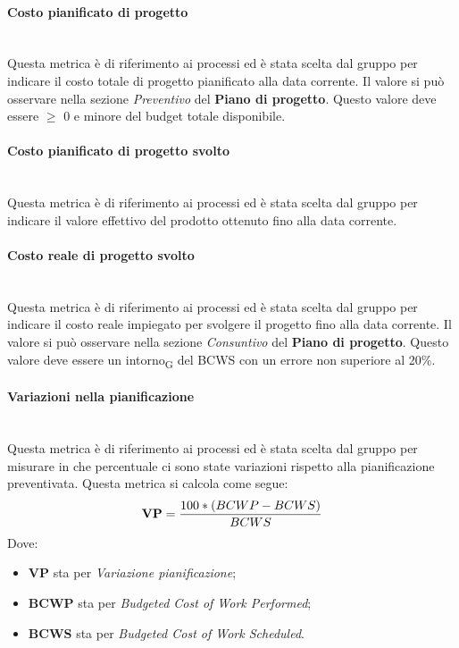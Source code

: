 \paragraph{Costo pianificato di progetto}\mbox{}\\
Questa metrica è di riferimento ai processi ed è stata scelta dal gruppo per indicare il costo totale di progetto pianificato alla data corrente. Il valore si può osservare nella sezione \textit{Preventivo} del \textbf{Piano di progetto}. Questo valore deve essere $\geq$ 0 e minore del budget totale disponibile.
\paragraph{Costo pianificato di progetto svolto}\mbox{}\\
Questa metrica è di riferimento ai processi ed è stata scelta dal gruppo per indicare il valore effettivo del prodotto ottenuto fino alla data corrente.
\paragraph{Costo reale di progetto svolto}\mbox{}\\
Questa metrica è di riferimento ai processi ed è stata scelta dal gruppo per indicare il costo reale impiegato per svolgere il progetto fino alla data corrente. Il valore si può osservare nella sezione \textit{Consuntivo} del \textbf{Piano di progetto}. Questo valore deve essere un intorno\textsubscript{G} del BCWS con un errore non superiore al 20\%.
\paragraph{Variazioni nella pianificazione}\mbox{}\\
Questa metrica è di riferimento ai processi ed è stata scelta dal gruppo per misurare in che percentuale ci sono state variazioni rispetto alla pianificazione preventivata. Questa metrica si calcola come segue:
\begin{align*}
	\centering
	\textbf{VP} = \frac{100 * (BCWP - BCWS)}{BCWS}
\end{align*}
Dove:
\begin{itemize}
	\item \textbf{VP} sta per \textit{Variazione pianificazione};
	\item \textbf{BCWP} sta per \textit{Budgeted Cost of Work Performed};
	\item \textbf{BCWS} sta per \textit{Budgeted Cost of Work Scheduled}.
\end{itemize}
